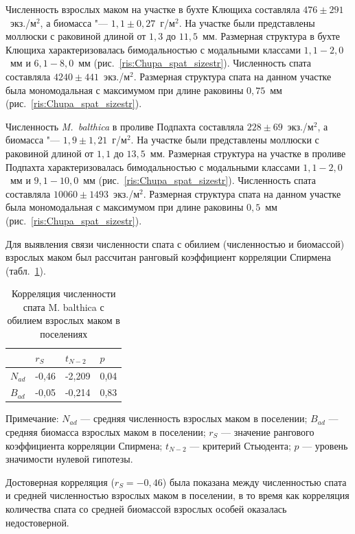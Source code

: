 Численность взрослых маком на участке в бухте Клющиха составляла $476 \pm 291$~экз./м$^2$, а биомасса "--- $1,1 \pm 0,27$~г/м$^2$. 
На участке были представлены моллюски с раковиной длиной от $1,3$ до $11,5$~мм. 
Размерная структура в бухте Клющиха характеризовалась бимодальностью с модальными классами $1,1 - 2,0$~мм и $6,1 - 8,0$~мм (рис.~\ref{ris:Chupa_spat_sizestr}). 
Численность спата составляла $4240 \pm 441$~экз./м$^2$. 
Размерная структура спата на данном участке была мономодальная с максимумом при длине раковины $0,75$~мм (рис.~\ref{ris:Chupa_spat_sizestr}).

Численность {\it M.~balthica} в проливе Подпахта составляла $228 \pm 69$~экз./м$^2$, а биомасса "--- $1,9 \pm 1,21$~г/м$^2$. 
На участке были представлены моллюски с раковиной длиной от $1,1$ до $13,5$~мм. 
Размерная структура на участке в проливе Подпахта характеризовалась бимодальностью с модальными классами $1,1 - 2,0$~мм и $9,1 - 10,0$~мм (рис.~\ref{ris:Chupa_spat_sizestr}). 
Численность спата составляла $10060 \pm 1493$~экз./м$^2$. 
Размерная структура спата на данном участке была мономодальная с максимумом при длине раковины $0,5$~мм (рис.~\ref{ris:Chupa_spat_sizestr}).

Для выявления связи численности спата с обилием (численностью и биомассой) взрослых маком был рассчитан ранговый коэффициент корреляции Спирмена (табл.~\ref{spat_abult_correlation}). 
\begin{table}[p]
\caption{Корреляция численности спата M. balthica с  обилием взрослых маком в поселениях}
\label{spat_abult_correlation}
\begin{center}
\begin{tabular}{|l|lll|}
\hline
     & $r_S$    & $t_{N-2}$   & $p$    \\ \hline
$N_{ad}$ & -0,46 & -2,209 & 0,04 \\
$B_{ad}$ & -0,05 & -0,214 & 0,83\\ \hline
\end{tabular}
\end{center}

\footnotesize{Примечание: $N_{ad}$ --- средняя численность взрослых маком в поселении; 
$B_{ad}$ --- средняя биомасса взрослых маком в поселении; 
$r_S$ --- значение рангового коэффициента корреляции Спирмена; 
$t_{N-2}$ --- критерий Стьюдента;   
$p$ --- уровень значимости нулевой гипотезы.}
\end{table}
До\-сто\-вер\-ная корреляция ($r_S = -0,46$) была показана между численностью спата и средней численностью взрослых маком в поселении, в то время как корреляция количества спата со средней биомассой взрослых особей оказалась недостоверной.

